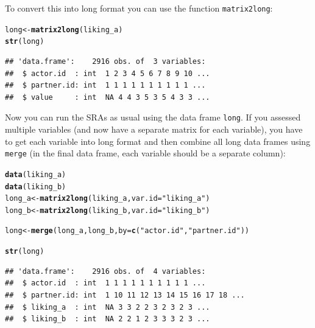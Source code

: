 \documentclass[a4paper]{article}\usepackage[]{graphicx}\usepackage[]{color}
\makeatletter
\newcommand{\hlstr}[1]{\textcolor[rgb]{0.192,0.494,0.8}{#1}}%
\newcommand{\hlstd}[1]{\textcolor[rgb]{0.345,0.345,0.345}{#1}}%
\newcommand{\hlkwb}[1]{\textcolor[rgb]{0.69,0.353,0.396}{#1}}%
\newcommand{\hlkwc}[1]{\textcolor[rgb]{0.333,0.667,0.333}{#1}}%
\newcommand{\hlkwd}[1]{\textcolor[rgb]{0.737,0.353,0.396}{\textbf{#1}}}%
\newenvironment{kframe}{%
 \def\at@end@of@kframe{}%
 \ifinner\ifhmode%
  \def\at@end@of@kframe{\end{minipage}}%
  \begin{minipage}{\columnwidth}%
 \fi\fi%
 \def\FrameCommand##1{\hskip\@totalleftmargin \hskip-\fboxsep
 \colorbox{shadecolor}{##1}\hskip-\fboxsep
     \hskip-\linewidth \hskip-\@totalleftmargin \hskip\columnwidth}%
 \MakeFramed {\advance\hsize-\width
   \@totalleftmargin\z@ \linewidth\hsize
   \@setminipage}}%
 {\par\unskip\endMakeFramed%
 \at@end@of@kframe}
\newenvironment{knitrout}{}{} %
\makeatother
\begin{document}
To convert this into long format you can use the function \texttt{matrix2long}:

\begin{knitrout}\small
{}\color{fgcolor}\begin{kframe}
\begin{alltt}
\hlstd{long} \hlkwb{<-} \hlkwd{matrix2long}\hlstd{(liking_a)}
\hlkwd{str}\hlstd{(long)}
\end{alltt}
\begin{verbatim}
## 'data.frame':	2916 obs. of  3 variables:
##  $ actor.id  : int  1 2 3 4 5 6 7 8 9 10 ...
##  $ partner.id: int  1 1 1 1 1 1 1 1 1 1 ...
##  $ value     : int  NA 4 4 3 5 3 5 4 3 3 ...
\end{verbatim}
\end{kframe}
\end{knitrout}

Now you can run the SRAs as usual using the data frame \texttt{long}. If you assessed multiple variables (and now have a separate matrix for each variable), you have to get each variable into long format and then combine all long data frames using \texttt{merge} (in the final data frame, each variable should be a separate column):

\begin{knitrout}\small
{}\color{fgcolor}\begin{kframe}
\begin{alltt}
\hlkwd{data}\hlstd{(liking_a)}
\hlkwd{data}\hlstd{(liking_b)}
\hlstd{long_a} \hlkwb{<-} \hlkwd{matrix2long}\hlstd{(liking_a,} \hlkwc{var.id} \hlstd{=} \hlstr{"liking_a"}\hlstd{)}
\hlstd{long_b} \hlkwb{<-} \hlkwd{matrix2long}\hlstd{(liking_b,} \hlkwc{var.id} \hlstd{=} \hlstr{"liking_b"}\hlstd{)}

\hlstd{long} \hlkwb{<-} \hlkwd{merge}\hlstd{(long_a, long_b,} \hlkwc{by} \hlstd{=} \hlkwd{c}\hlstd{(}\hlstr{"actor.id"}\hlstd{,} \hlstr{"partner.id"}\hlstd{))}

\hlkwd{str}\hlstd{(long)}
\end{alltt}
\begin{verbatim}
## 'data.frame':	2916 obs. of  4 variables:
##  $ actor.id  : int  1 1 1 1 1 1 1 1 1 1 ...
##  $ partner.id: int  1 10 11 12 13 14 15 16 17 18 ...
##  $ liking_a  : int  NA 3 3 2 2 3 2 3 2 3 ...
##  $ liking_b  : int  NA 2 2 1 2 3 3 3 2 3 ...
\end{verbatim}
\end{kframe}
\end{knitrout}
\end{document}
